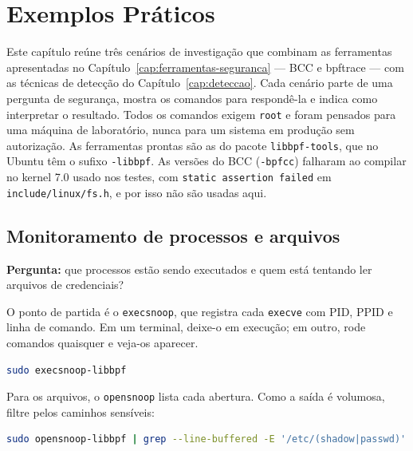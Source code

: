 \chapter{Exemplos Práticos}
\label{cap:exemplos-seguranca}

Este capítulo reúne três cenários de investigação que combinam as ferramentas
apresentadas no Capítulo~\ref{cap:ferramentas-seguranca} --- BCC e bpftrace ---
com as técnicas de detecção do Capítulo~\ref{cap:deteccao}. Cada cenário parte de
uma pergunta de segurança, mostra os comandos para respondê-la e indica como
interpretar o resultado. Todos os comandos exigem \texttt{root} e foram pensados
para uma máquina de laboratório, nunca para um sistema em produção sem
autorização. As ferramentas prontas são as do pacote \texttt{libbpf-tools}, que no Ubuntu
têm o sufixo \texttt{-libbpf}. As versões do BCC (\texttt{-bpfcc}) falharam ao
compilar no kernel 7.0 usado nos testes, com \texttt{static assertion failed}
em \texttt{include/linux/fs.h}, e por isso não são usadas aqui.

\section{Monitoramento de processos e arquivos}
\label{sec:ex-processos-arquivos}

\textbf{Pergunta:} que processos estão sendo executados e quem está tentando ler
arquivos de credenciais?

O ponto de partida é o \texttt{execsnoop}, que registra cada \texttt{execve} com
PID, PPID e linha de comando. Em um terminal, deixe-o em execução; em outro, rode
comandos quaisquer e veja-os aparecer.

\begin{lstlisting}[language=bash, caption={Execuções de processos com o \texttt{execsnoop-libbpf}.}]
sudo execsnoop-libbpf
\end{lstlisting}

Para os arquivos, o \texttt{opensnoop} lista cada abertura. Como a saída é
volumosa, filtre pelos caminhos sensíveis:

\begin{lstlisting}[language=bash, caption={Aberturas de arquivos sensíveis com o \texttt{opensnoop}.}]
sudo opensnoop-libbpf | grep --line-buffered -E '/etc/(shadow|passwd)'
\end{lstlisting}

